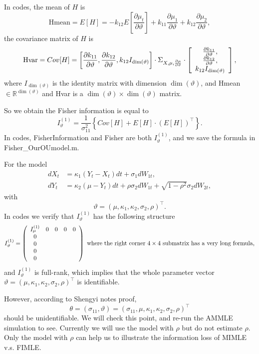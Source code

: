 \documentclass[11pt]{article}%
\theoremstyle{definition}
\begin{document}
In codes, the mean of $H$ is%
\[
\text{Hmean}=E[H]=-k_{12}E\left[  \frac{\partial\mu_{t}}{\partial\vartheta
}\right]  +k_{11}\frac{\partial\mu_{1}}{\partial\vartheta}+k_{12}%
\frac{\partial\mu_{2}}{\partial\vartheta},
\]
the covariance matrix of $H$ is%
\[
\text{Hvar}=Cov[H]=\left[  \frac{\partial k_{11}}{\partial\vartheta}%
,\frac{\partial k_{12}}{\partial\vartheta},k_{12}I_{\dim(\vartheta)}\right]
\cdot\Sigma_{X,\mu,\frac{\partial\mu}{\partial\vartheta}}\cdot\left[
\begin{array}
[c]{c}%
\frac{\partial k_{11}}{\partial\vartheta},\\
\frac{\partial k_{12}}{\partial\vartheta},\\
k_{12}I_{\dim(\vartheta)}%
\end{array}
\right]  ,
\]
where $I_{\dim(\vartheta)}$ is the identity matrix with dimension
$\dim(\vartheta)$, and Hmean$\in\mathbb{R}^{\dim(\vartheta)}$ and Hvar is a
$\dim(\vartheta)\times\dim(\vartheta)$ matrix.

So we obtain the Fisher information is equal to%
\[
I_{\vartheta}^{(1)}=\frac{1}{\sigma_{11}^{2}}\left\{  Cov[H]+E[H]\cdot
(E[H])^{\top}\right\}  .
\]
In codes, FisherInformation and Fisher are both $I_{\vartheta}^{(1)}$, and we
save the formula in Fisher\_OurOUmodel.m.

For the model%
\begin{align*}
dX_{t}  &  =\kappa{_{1}({Y}_{t}-X_{t})}dt+\sigma_{1}dW_{1t},\\
dY_{t}  &  =\kappa{_{2}(\mu-{Y}_{t})}dt+\rho\sigma_{2}dW_{1t}+\sqrt{1-\rho
^{2}}\sigma_{2}dW_{2t},
\end{align*}
with%
\[
\vartheta=(\mu,\kappa{_{1},}\kappa_{2},\sigma_{2},\rho)^{\intercal}.
\]
In codes we verify that $I_{\vartheta}^{(1)}$ has the following structure%
\[
I_{\vartheta}^{(1)}=\left(
\begin{array}
[c]{ccccc}%
I_{\mu}^{(1)} & 0 & 0 & 0 & 0\\
0 &  &  &  & \\
0 &  &  &  & \\
0 &  &  &  & \\
0 &  &  &  &
\end{array}
\right)  \text{ where the right corner }4\times4\text{ submatrix has a very
long formula,}%
\]
and $I_{\vartheta}^{(1)}$ is full-rank, which implies that the whole parameter
vector $\vartheta=(\mu,\kappa{_{1},}\kappa_{2},\sigma_{2},\rho)^{\intercal}$
is identifiable.

However, according to Shengyi notes proof,
\[
\theta=(\sigma_{11},\vartheta)=(\sigma_{11},\mu,\kappa{_{1},}\kappa_{2}%
,\sigma_{2},\rho)^{\intercal}%
\]
should be unidentifiable. We will check this point, and re-run the AMMLE
simulation to see. Currently we will use the model with $\rho$ but do not
estimate $\rho$. Only the model with $\rho$ can help us to illustrate the
information loss of MIMLE v.s. FIMLE.
\end{document}
